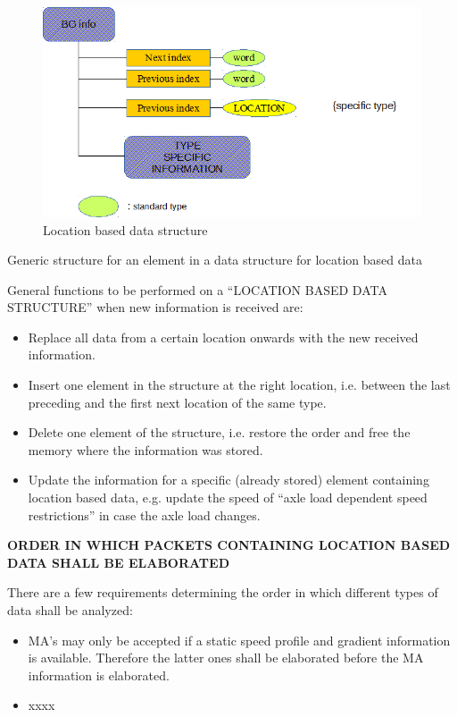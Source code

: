 \documentclass{template/openetcs_report}
\begin{document}
\begin{figure}[hbtp]
\centering
\includegraphics[angle=0, scale=0.9] {images/location_based_datastructure.png}
\caption{Location based data structure}
\end{figure}

Generic structure for an element in a data structure for location based data


General functions to be performed on a “LOCATION BASED DATA STRUCTURE” when new information is received are:
\begin{itemize}
\item Replace all data from a certain location onwards with the new received information.
\item Insert one element in the structure at the right location, i.e. between the last preceding and the first next location of the same type.
\item Delete one element of the structure, i.e. restore the order and free the memory where the information was stored.
\item Update the information for a specific (already stored) element containing location based data, e.g. update the speed of “axle load dependent speed restrictions” in case the axle load changes.
\end{itemize}

\textbf{ORDER IN WHICH PACKETS CONTAINING LOCATION BASED DATA SHALL BE ELABORATED}

There are a few requirements determining the order in which different types of data shall be analyzed:
\begin{itemize}
\item MA's may only be accepted if a static speed profile and gradient information is available. Therefore the latter ones shall be elaborated before the MA information is elaborated.
\item xxxx
\end{itemize}
\end{document}

